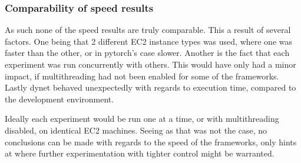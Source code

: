 \subsubsection{Comparability of speed results}

As such none of the speed results are truly comparable. This a result of
several factors.
One being that 2 different EC2 instance types was used, where one was faster
than the other, or in pytorch's case slower.
Another is the fact that each experiment was run concurrently with others. This
would have only had a minor impact, if multithreading had not been enabled for
some of the frameworks.
Lastly dynet behaved unexpectedly with regards to execution time, compared to the
development environment.

Ideally each experiment would be run one at a time, or with multithreading
disabled, on identical EC2 machines. Seeing as that was not the case, no
conclusions can be made with regards to the speed of the frameworks, only hints
at where further experimentation with tighter control might be warranted.

